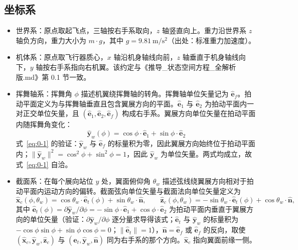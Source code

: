 \documentclass[11pt,a4paper]{ctexart}
\numberwithin{equation}{section}
\begin{document}
\subsection{坐标系}

\begin{itemize}
  \item 世界系：原点取起飞点，三轴按右手系取向，$z$ 轴竖直向上。重力沿世界系 $z$ 轴负方向，重力大小为 $m \cdot g$，其中 $g = 9.81\ \mathrm{m/s^2}$（出处：标准重力加速度）。
  \item 机体系：原点取飞行器质心，$x$ 轴沿机身轴线向前，$z$ 轴垂直于机身轴线向下，$y$ 轴按右手系指向右机翼。该约定与《推导\_状态空间方程\_全解析版.md》第 0.1 节一致。
  \item 挥舞轴系：挥舞角 $\phi$ 描述机翼绕挥舞轴的转角。挥舞轴单位矢量记为 $\hat{\bm{e}}_f$。拍动平面定义为与挥舞轴垂直且包含翼展方向的平面。$\hat{\bm{e}}_1$ 与 $\hat{\bm{e}}_2$ 为拍动平面内一对正交单位矢量，且 $(\hat{\bm{e}}_1, \hat{\bm{e}}_2, \hat{\bm{e}}_f)$ 构成右手系。翼展方向单位矢量在拍动平面内随挥舞角变化：
  \begin{equation}
    \hat{\bm{y}}_w(\phi) = \cos\phi \cdot \hat{\bm{e}}_1 + \sin\phi \cdot \hat{\bm{e}}_2 \label{eq:0-1}
  \end{equation}
  式~\eqref{eq:0-1} 的验证：$\hat{\bm{y}}_w$ 与 $\hat{\bm{e}}_f$ 的标量积为零，因此翼展方向始终位于拍动平面内；$\|\hat{\bm{y}}_w\|^2 = \cos^2\phi + \sin^2\phi = 1$，因此 $\hat{\bm{y}}_w$ 为单位矢量。两式均成立，故式~\eqref{eq:0-1} 自洽。
  \item 截面系：在每个展向站位 $y$ 处，翼面俯仰角 $\theta_w$ 描述弦线绕翼展方向相对于拍动平面内运动方向的偏转。截面弦向单位矢量与截面法向单位矢量定义为
  \begin{equation}
    \hat{\bm{x}}_c(\phi, \theta_w) = \cos\theta_w \cdot \hat{\bm{e}}_t(\phi) + \sin\theta_w \cdot \hat{\bm{n}}, \qquad
    \hat{\bm{z}}_c(\phi, \theta_w) = -\sin\theta_w \cdot \hat{\bm{e}}_t(\phi) + \cos\theta_w \cdot \hat{\bm{n}}, \label{eq:0-2}
  \end{equation}
  其中 $\hat{\bm{e}}_t(\phi) = \partial\hat{\bm{y}}_w / \partial\phi = -\sin\phi \cdot \hat{\bm{e}}_1 + \cos\phi \cdot \hat{\bm{e}}_2$ 为拍动平面内垂直于翼展方向的单位矢量（验证：$\partial\hat{\bm{y}}_w/\partial\phi$ 逐分量求导得该式；$\hat{\bm{e}}_t$ 与 $\hat{\bm{y}}_w$ 的标量积为 $-\cos\phi\sin\phi + \sin\phi\cos\phi = 0$；$\|\hat{\bm{e}}_t\| = 1$），$\hat{\bm{n}} = \hat{\bm{e}}_f$ 或 $\hat{\bm{e}}_f$ 的反向，取使 $(\hat{\bm{x}}_c, \hat{\bm{y}}_w, \hat{\bm{z}}_c)$ 与 $(\hat{\bm{e}}_t, \hat{\bm{y}}_w, \hat{\bm{n}})$ 同为右手系的那个方向。$\hat{\bm{x}}_c$ 指向翼面前缘一侧。
\end{itemize}
\end{document}
